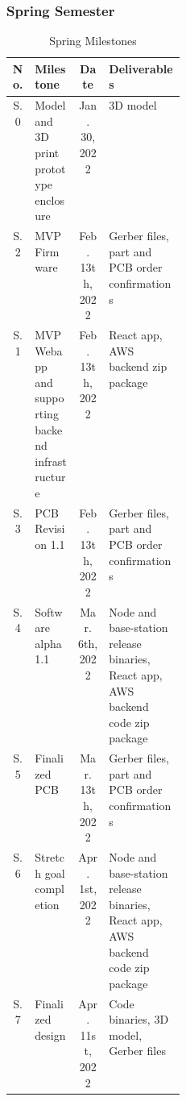 \subsubsection{Spring Semester}
\begin{table}[H]
    \footnotesize  
    \caption{Spring Milestones}

    \begin{tabularx}{\linewidth}{| c | p{0.25\linewidth} | c | X |}
      \hline
      No. & Milestone & Date & Deliverables 
      \\\hline\hline

      S.0 
      & Model and 3D print prototype enclosure
      & Jan. 30, 2022
      & 3D model
      \\\hline

      S.2 
      & MVP Firmware
      & Feb. 13th, 2022 
      & Gerber files, part and PCB order confirmations
      \\\hline

      S.1 
      & MVP Webapp and supporting backend infrastructure
      & Feb. 13th, 2022 
      & React app, AWS backend zip package
      \\\hline

      S.3 
      & PCB Revision 1.1
      & Feb. 13th, 2022 
      & Gerber files, part and PCB order confirmations
      \\\hline

      S.4 
      & Software alpha 1.1 
      & Mar. 6th, 2022 
      & Node and base-station release binaries, React app, AWS backend code zip package 
      \\\hline

      S.5
      & Finalized PCB
      & Mar. 13th, 2022 
      & Gerber files, part and PCB order confirmations
      \\\hline

      S.6 
      & Stretch goal completion
      & Apr. 1st, 2022
      & Node and base-station release binaries, React app, AWS backend code zip package 
      \\\hline

      S.7 
      & Finalized design
      & Apr. 11st, 2022
      & Code binaries, 3D model, Gerber files
      \\\hline

    \end{tabularx}
    \label{tab:spring-milestones}
\end{table}

